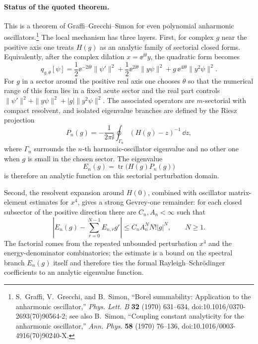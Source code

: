 \paragraph{Status of the quoted theorem.}
This is a theorem of Graffi--Grecchi--Simon for even polynomial anharmonic
oscillators.\footnote{S.~Graffi, V.~Grecchi, and B.~Simon, ``Borel
summability: Application to the anharmonic oscillator,'' \emph{Phys. Lett. B}
\textbf{32} (1970) 631--634, doi:10.1016/0370-2693(70)90564-2; see also
B.~Simon, ``Coupling constant analyticity for the anharmonic oscillator,''
\emph{Ann. Phys.} \textbf{58} (1970) 76--136,
doi:10.1016/0003-4916(70)90240-X.}  The local mechanism has three layers.
First, for complex \(g\) near the positive axis one treats \(H(g)\) as an
analytic family of sectorial closed forms.  Equivalently, after the complex
dilation \(x=\ee^{\ii\theta}y\), the quadratic form becomes
\[
  q_{g,\theta}[\psi]
  =
  \frac12\ee^{-2\ii\theta}\|\psi'\|^2
  +\frac12\ee^{2\ii\theta}\|y\psi\|^2
  +g\,\ee^{4\ii\theta}\|y^2\psi\|^2 .
\]
For \(g\) in a sector around the positive real axis one chooses \(\theta\) so
that the numerical range of this form lies in a fixed acute sector and the
real part controls \(\|\psi'\|^2+\|y\psi\|^2+|g|\|y^2\psi\|^2\).  The
associated operators are \(m\)-sectorial with compact resolvent, and isolated
eigenvalue branches are defined by the Riesz projection
\[
  P_n(g)
  =
  -\frac{1}{2\pi\ii}
  \oint_{\Gamma_n}(H(g)-z)^{-1}\,\dd z ,
\]
where \(\Gamma_n\) surrounds the \(n\)-th harmonic-oscillator eigenvalue and
no other one when \(g\) is small in the chosen sector.  The eigenvalue
\[
  E_n(g)=\operatorname{tr}\bigl(H(g)P_n(g)\bigr)
\]
is therefore an analytic function on this sectorial perturbation domain.

Second, the resolvent expansion around \(H(0)\), combined with oscillator
matrix-element estimates for \(x^4\), gives a strong Gevrey-one remainder:
for each closed subsector of the positive direction there are
\(C_n,A_n<\infty\) such that
\begin{equation}
  \left|
    E_n(g)-\sum_{r=0}^{N-1}E_{n,r}g^r
  \right|
  \le
  C_n A_n^N N! |g|^N ,
  \qquad N\ge1 .
  \label{eq:quartic-oscillator-strong-borel-remainder}
\end{equation}
The factorial comes from the repeated unbounded perturbation \(x^4\) and the
energy-denominator combinatorics; the estimate is a bound on the spectral
branch \(E_n(g)\) itself and therefore ties the formal
Rayleigh--Schr\"odinger coefficients to an analytic eigenvalue function.

